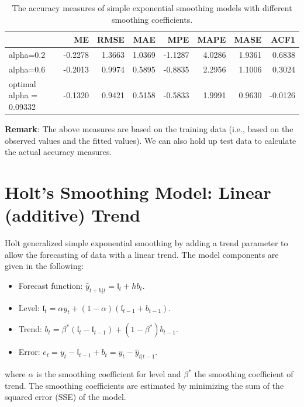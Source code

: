 \documentclass[
]{book}
\begin{document}
\begin{table}

\caption{\label{tab:unnamed-chunk-227}The accuracy measures of simple exponential 
      smoothing models with different smoothing coefficients.}
\centering
\begin{tabular}[t]{l|r|r|r|r|r|r|r}
\hline
  & ME & RMSE & MAE & MPE & MAPE & MASE & ACF1\\
\hline
alpha=0.2 & -0.2278 & 1.3663 & 1.0369 & -1.1287 & 4.0286 & 1.9361 & 0.6838\\
\hline
alpha=0.6 & -0.2013 & 0.9974 & 0.5895 & -0.8835 & 2.2956 & 1.1006 & 0.3024\\
\hline
optimal alpha = 0.09332 & -0.1320 & 0.9421 & 0.5158 & -0.5833 & 1.9991 & 0.9630 & -0.0126\\
\hline
\end{tabular}
\end{table}

\textbf{Remark}: The above measures are based on the training data (i.e., based on the observed values and the fitted values). We can also hold up test data to calculate the actual accuracy measures.

\hypertarget{holts-smoothing-model-linear-additive-trend}{%
\section{Holt's Smoothing Model: Linear (additive) Trend}\label{holts-smoothing-model-linear-additive-trend}}

Holt generalized simple exponential smoothing by adding a trend parameter to allow the forecasting of data with a linear trend. The model components are given in the following:

\begin{itemize}
\item
  Forecast function: \(\hat{y}_{t+h|t} = \mathfrak{l}_t + h b_t\).
\item
  Level: \(\mathfrak{l}_t = \alpha y_t + (1-\alpha)(\mathfrak{l}_{t-1} + b_{t-1})\).
\item
  Trend: \(b_t=\beta^*(\mathfrak{l}_t-\mathfrak{l}_{t-1}) + (1-\beta^*)b_{t-1}\).
\item
  Error: \(e_t = y_t-{\mathfrak{l}_{t-1} + b_t} = y_t-\hat{y}_{t|t-1}\).
\end{itemize}

where \(\alpha\) is the smoothing coefficient for level and \(\beta^*\) the smoothing coefficient of trend. The smoothing coefficients are estimated by minimizing the sum of the squared error (SSE) of the model.
\end{document}
